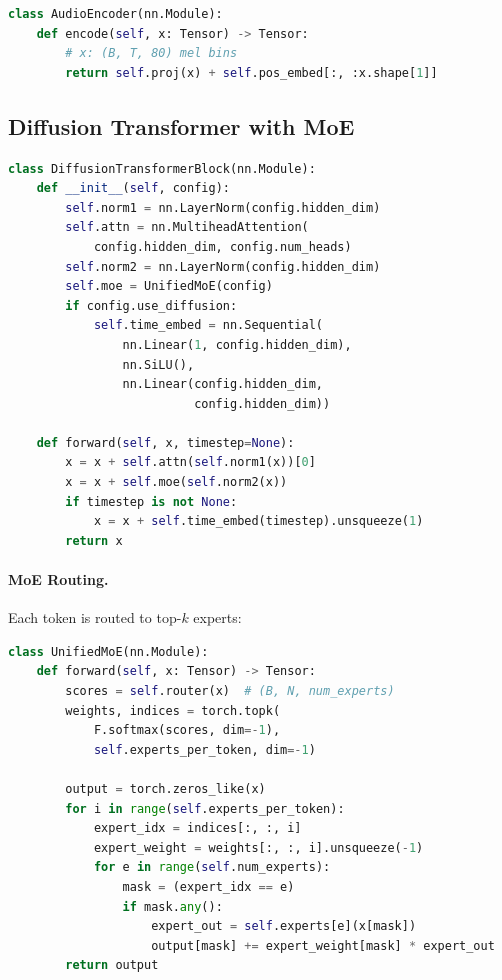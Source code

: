 \begin{lstlisting}[language=Python]
class AudioEncoder(nn.Module):
    def encode(self, x: Tensor) -> Tensor:
        # x: (B, T, 80) mel bins
        return self.proj(x) + self.pos_embed[:, :x.shape[1]]
\end{lstlisting}

\subsection{Diffusion Transformer with MoE}

\begin{lstlisting}[language=Python]
class DiffusionTransformerBlock(nn.Module):
    def __init__(self, config):
        self.norm1 = nn.LayerNorm(config.hidden_dim)
        self.attn = nn.MultiheadAttention(
            config.hidden_dim, config.num_heads)
        self.norm2 = nn.LayerNorm(config.hidden_dim)
        self.moe = UnifiedMoE(config)
        if config.use_diffusion:
            self.time_embed = nn.Sequential(
                nn.Linear(1, config.hidden_dim),
                nn.SiLU(),
                nn.Linear(config.hidden_dim,
                          config.hidden_dim))

    def forward(self, x, timestep=None):
        x = x + self.attn(self.norm1(x))[0]
        x = x + self.moe(self.norm2(x))
        if timestep is not None:
            x = x + self.time_embed(timestep).unsqueeze(1)
        return x
\end{lstlisting}

\paragraph{MoE Routing.} Each token is routed to top-$k$ experts:

\begin{lstlisting}[language=Python]
class UnifiedMoE(nn.Module):
    def forward(self, x: Tensor) -> Tensor:
        scores = self.router(x)  # (B, N, num_experts)
        weights, indices = torch.topk(
            F.softmax(scores, dim=-1),
            self.experts_per_token, dim=-1)

        output = torch.zeros_like(x)
        for i in range(self.experts_per_token):
            expert_idx = indices[:, :, i]
            expert_weight = weights[:, :, i].unsqueeze(-1)
            for e in range(self.num_experts):
                mask = (expert_idx == e)
                if mask.any():
                    expert_out = self.experts[e](x[mask])
                    output[mask] += expert_weight[mask] * expert_out
        return output
\end{lstlisting}

